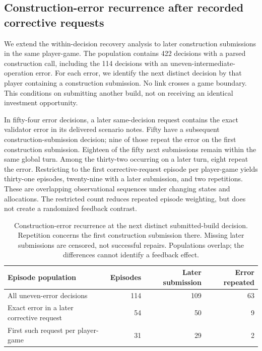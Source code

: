 \subsection{Construction-error recurrence after recorded corrective requests}
\label{sec:recurrence}

We extend the within-decision recovery analysis to later construction submissions in the same player-game. The population contains 422 decisions with a parsed construction call, including the 114 decisions with an uneven-intermediate-operation error. For each error, we identify the next distinct decision by that player containing a construction submission. No link crosses a game boundary. This conditions on submitting another build, not on receiving an identical investment opportunity.

In fifty-four error decisions, a later same-decision request contains the exact validator error in its delivered scenario notes. Fifty have a subsequent construction-submission decision; nine of those repeat the error on the first construction submission. Eighteen of the fifty next submissions remain within the same global turn. Among the thirty-two occurring on a later turn, eight repeat the error. Restricting to the first corrective-request episode per player-game yields thirty-one episodes, twenty-nine with a later submission, and two repetitions. These are overlapping observational sequences under changing states and allocations. The restricted count reduces repeated episode weighting, but does not create a randomized feedback contrast.

\begin{table}[t]
\centering\small
\begin{tabularx}{\linewidth}{Yrrr}
\toprule
Episode population & Episodes & Later submission & Error repeated\\
\midrule
All uneven-error decisions & 114 & 109 & 63\\
Exact error in a later corrective request & 54 & 50 & 9\\
First such request per player-game & 31 & 29 & 2\\
\bottomrule
\end{tabularx}
\caption{Construction-error recurrence at the next distinct submitted-build decision. Repetition concerns the first construction submission there. Missing later submissions are censored, not successful repairs. Populations overlap; the differences cannot identify a feedback effect.}
\label{tab:recurrence}
\end{table}

